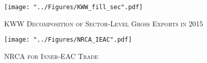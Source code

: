 \documentclass[a4paper]{article}
\begin{document}
\begin{figure}[h!] \vspace{-0.1cm}
\centering
\caption{\label{fig:KWW_fill_sec}\textsc{KWW Decomposition of Sector-Level Gross Exports in 2015}}
\texttt{[image: "../Figures/KWW\_fill\_sec".pdf]} %
\vspace{-1.5cm}
\end{figure}
\FloatBarrier


\begin{figure}[h!]
\centering
\caption{\label{fig:NRCA_IEAC}\textsc{NRCA for Inner-EAC Trade}}
\texttt{[image: "../Figures/NRCA\_IEAC".pdf]} %
\end{figure}
\FloatBarrier
\end{document}
